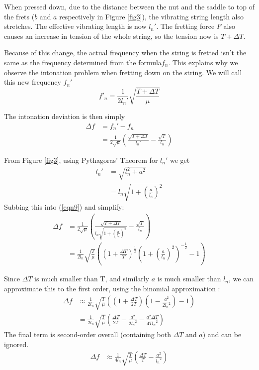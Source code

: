 When pressed down, due to the distance between the nut and the saddle to top of the frets ($b$ and $a$ respectively in Figure \ref{fig3}), the vibrating string length also stretches. The effective vibrating length is now $l_n'$. The fretting force $F$ also causes an increase in tension of the whole string, so the tension now is $T+ \Delta T$. \par
Because of this change, the actual frequency when the string is fretted  isn't the same as the frequency determined from the formula$f_n$. This explains why we observe the intonation problem when fretting down on the string. We will call this new frequency $f_n'$
\begin{equation}\label{eqn7}
    f'_n= \frac{1}{2l_n'}\sqrt{\frac{T+\Delta T}{\mu}}
\end{equation}

The intonation deviation is then simply
\begin{align}
    \Delta f &= f_n'-f_n \\
    &= \frac{1}{2\sqrt{\mu}} \left( \frac{\sqrt{T+\Delta T}}{l_n'} - \frac{\sqrt{T}}{l_n} \right)\label{eqn9}
\end{align}

From Figure \ref{fig3}, using Pythagoras' Theorem for $l_n'$ we get
\begin{align}
    l_n' &= \sqrt{l_n^2+a^2} \\
    &= l_n\sqrt{1+\left(\frac{a}{l_n}\right) ^2} 
\end{align}
Subbing this into (\ref{eqn9}) and simplify:
\begin{align}
    \Delta f &= \frac{1}{2\sqrt{\mu}} \left( \frac{\sqrt{T+\Delta T}}{l_n\sqrt{1+\left(\frac{a}{l_n}\right) ^2}} - \frac{\sqrt{T}}{l_n} \right) \\
    &= \frac{1}{2l_n} \sqrt{\frac{T}{\mu}}\left(\left(1+\frac{\Delta T}{T}\right)^{\frac{1}{2}} \left( 1+\left(\frac{a}{l_n}\right) ^2\right)^{-\frac{1}{2}} - 1 \right)
\end{align}

Since $\Delta T$ is much smaller than T, and similarly $a$ is much smaller than $l_n$, we can approximate this to the first order, using the binomial approximation \cite{spakula}: 
\begin{align}
    \Delta f &\approx \frac{1}{2l_n} \sqrt{\frac{T}{\mu}} \left( \left(1+\frac{\Delta T}{2T}\right) \left( 1- \frac{a^2}{2{l_n}^2} \right) - 1\right)\label{eqn18} \\ 
    &= \frac{1}{2l_n} \sqrt{\frac{T}{\mu}} \left(\frac{\Delta T}{2T} - \frac{a^2}{2{l_n}^2} - \frac{a^2\Delta T}{4T{l_n}^2}\right)
\end{align}
The final term is second-order overall (containing both $\Delta T$ and $a$) and can be ignored.
\begin{align}
    \Delta f &\approx \frac{1}{4l_n} \sqrt{\frac{T}{\mu}} \left( \frac{\Delta T}{T} - \frac{a^2}{{l_n}^2} \right) \label{eqn20}
\end{align}